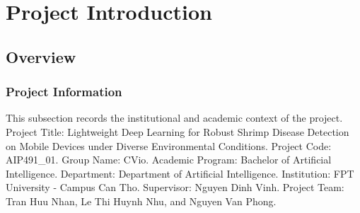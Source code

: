 \documentclass[12pt,a4paper]{report}
\begin{document}
\chapter{Project Introduction}
\section{Overview}
\subsection{Project Information}
This subsection records the institutional and academic context of the project. Project Title: Lightweight Deep Learning for Robust Shrimp Disease Detection on Mobile Devices under Diverse Environmental Conditions. Project Code: AIP491\_01. Group Name: CVio. Academic Program: Bachelor of Artificial Intelligence. Department: Department of Artificial Intelligence. Institution: FPT University - Campus Can Tho. Supervisor: Nguyen Dinh Vinh. Project Team: Tran Huu Nhan, Le Thi Huynh Nhu, and Nguyen Van Phong.\par
\begingroup
\footnotesize
\setlength{\tabcolsep}{2pt}
\renewcommand{\arraystretch}{1.16}
\end{document}
